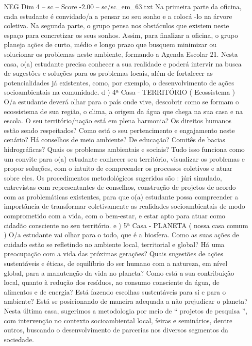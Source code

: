 \begin{textsample}{NEG Dim 4 – sc – Score -2.00 – sc/sc\_em\_63.txt}
Na primeira parte da oficina, cada estudante é convidado/a a pensar no seu sonho e a colocá -lo na árvore coletiva.
Na segunda parte, o grupo pensa nos obstáculos que existem neste espaço para concretizar os seus sonhos.
Assim, para finalizar a oficina, o grupo planeja ações de curto, médio e longo prazo que busquem minimizar ou solucionar os problemas neste ambiente, formando a Agenda Escolar 21.
Nesta casa, o(a) estudante precisa conhecer a sua realidade e poderá intervir na busca de sugestões e soluções para os problemas locais, além de fortalecer as potencialidades já existentes, como, por exemplo, o desenvolvimento de ações socioambientais na comunidade. d ) 4ª Casa - TERRITÓRIO ( Ecossistema ) O/a estudante deverá olhar para o país onde vive, descobrir como se formam o ecossistema de sua região, o clima, a origem da água que chega na sua casa e na escola.
O seu território/nação está em plena harmonia?
Os direitos humanos estão sendo respeitados?
Como está o seu pertencimento e engajamento neste cenário?
Há conselhos de meio ambiente?
De educação?
Comitês de bacias hidrográficas?
Quais os problemas ambientais e sociais?
Tudo isso funciona como um convite para o(a) estudante conhecer seu território, visualizar os problemas e propor soluções, com o intuito de compreender os processos coletivos e atuar sobre eles.
Os procedimentos metodológicos sugeridos são : júri simulado, entrevistas com representantes de conselhos, construção de projetos de acordo com as problemáticas existentes, para que o(a) estudante possa compreender a importância de transformar coletivamente as realidades socioambientais de modo comprometido com a vida, com o bem-estar, e estar apto para atuar como cidadão consciente no seu território. e ) 5ª Casa - PLANETA ( nossa casa comum ) O/a estudante vai olhar para o todo, que é a biosfera.
Como as suas ações de cuidado estão se refletindo no ambiente local, territorial e global?
Há uma preocupação com a vida das próximas gerações?
Quais sugestões de ações sustentáveis e éticas, de equilíbrio do ser humano com a natureza, em nível global, para a manutenção da vida no planeta?
Como está a sua contribuição local, quanto à redução dos resíduos, ao consumo consciente da água, de alimentos e de energia?
Está fazendo escolhas sustentáveis para si e para o ambiente?
Está se posicionando de maneira adequada a não prejudicar o planeta?
Nesta última casa, sugerimos a metodologia por meio de “ projetos de pesquisa ”, com intervenção no contexto socioambiental local, feiras e seminários, dentre outros, buscando o desenvolvimento de parcerias nos diversos segmentos da sociedade.

\end{textsample}
